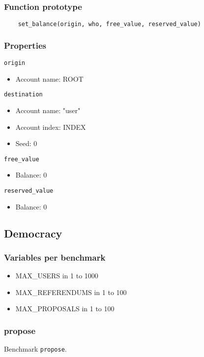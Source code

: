\documentclass[11pt,a4paper]{article}
\begin{document}
\subsubsection*{Function prototype}
\begin{verbatim}
    set_balance(origin, who, free_value, reserved_value)
\end{verbatim}

\subsubsection*{Properties}
\verb|origin|
\begin{itemize}
    \item Account name: ROOT
\end{itemize}
\verb|destination|
\begin{itemize}
    \item Account name: "user"
    \item Account index: INDEX
    \item Seed: 0
\end{itemize}
\verb|free_value|
\begin{itemize}
    \item Balance: 0
\end{itemize}
\verb|reserved_value|
\begin{itemize}
    \item Balance: 0
\end{itemize}

\subsection{Democracy}

\subsubsection*{Variables per benchmark}
\begin{itemize}
\item MAX\_USERS in 1 to 1000
\item MAX\_REFERENDUMS in 1 to 100
\item MAX\_PROPOSALS in 1 to 100
\end{itemize}

\subsubsection{propose}

Benchmark \verb|propose|.
\end{document}
